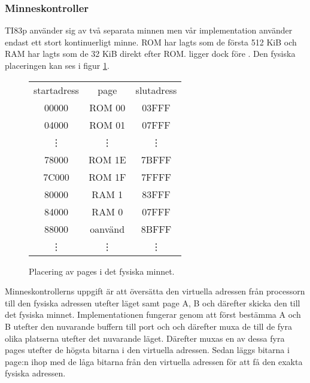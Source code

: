 \documentclass[main.tex]{subfiles}
\begin{document}
\subsubsection{Minneskontroller}
\label{sec:mmap}
TI83p använder sig av två separata minnen men vår implementation använder
endast ett stort kontinuerligt minne. ROM har lagts som de första 512 KiB och
RAM har lagts som de 32 KiB direkt efter ROM.  ligger dock före
. Den fysiska placeringen kan ses i figur \ref{fig:physical}.

\begin{figure}[H]
    \center
    \small\ttfamily\arraybackslash
    \begin{tabular}{c|c|c}
        \multicolumn{1}{c}{\normalfont startadress} &
        \multicolumn{1}{c}{\normalfont page} &
        \multicolumn{1}{c}{\normalfont slutadress} \\ \cline{2-2}
        00000  & ROM 00  & 03FFF \\ \cline{2-2}
        04000  & ROM 01  & 07FFF \\
        \multicolumn{1}{c}{\vdots} &
        \multicolumn{1}{c}{\vdots} & \vdots \\
        78000  & ROM 1E  & 7BFFF \\ \cline{2-2}
        7C000  & ROM 1F  & 7FFFF \\ \cline{2-2}
        80000  & RAM 1   & 83FFF \\ \cline{2-2}
        84000  & RAM 0   & 07FFF \\ \cline{2-2}
        88000  & oanvänd & 8BFFF \\ \cline{2-2}
        \vdots & \vdots  & \vdots \\
    \end{tabular}
    \caption{Placering av pages i det fysiska minnet.}
    \label{fig:physical}
\end{figure}

Minneskontrollerns uppgift är att översätta den virtuella adressen från
processorn till den fysiska adressen utefter läget samt page A, B och därefter
skicka den till det fysiska minnet. Implementationen fungerar genom att först
bestämma A och B utefter den nuvarande buffern till port  och
 och därefter muxa de till de fyra olika platserna utefter det
nuvarande läget. Därefter muxas en av dessa fyra pages utefter de högsta
bitarna i den virtuella adressen. Sedan läggs bitarna i page:n ihop med de låga
bitarna från den virtuella adressen för att få den exakta fysiska adressen.
\end{document}
